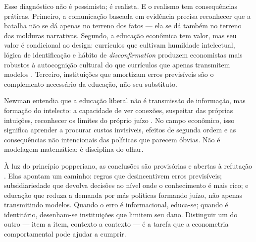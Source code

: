 Esse diagnóstico não é pessimista; é realista. E o realismo tem consequências práticas. Primeiro, a comunicação baseada em evidência precisa reconhecer que a batalha não se dá apenas no terreno dos fatos — ela se dá também no terreno das molduras narrativas. Segundo, a educação econômica tem valor, mas seu valor é condicional ao design: currículos que cultivam humildade intelectual, lógica de identificação e hábito de \textit{disconfirmation} produzem economistas mais robustos à autocognição cultural do que currículos que apenas transmitem modelos \cite{franco2022cartas}. Terceiro, instituições que amortizam erros previsíveis são o complemento necessário da educação, não seu substituto.

Newman entendia que a educação liberal não é transmissão de informação, mas formação do intelecto: a capacidade de ver conexões, suspeitar das próprias intuições, reconhecer os limites do próprio juízo \cite{newman2020ideia}. No campo econômico, isso significa aprender a procurar custos invisíveis, efeitos de segunda ordem e as consequências não intencionais das políticas que parecem óbvias. Não é modelagem matemática; é disciplina do olhar.

À luz do princípio popperiano, as conclusões são provisórias e abertas à refutação \cite{popperlogic}. Elas apontam um caminho: regras que desincentivem erros previsíveis; subsidiariedade que devolva decisões ao nível onde o conhecimento é mais rico; e educação que reduza a demanda por más políticas formando juízo, não apenas transmitindo modelos. Quando o erro é informacional, educa-se; quando é identitário, desenham-se instituições que limitem seu dano. Distinguir um do outro — item a item, contexto a contexto — é a tarefa que a econometria comportamental pode ajudar a cumprir.
